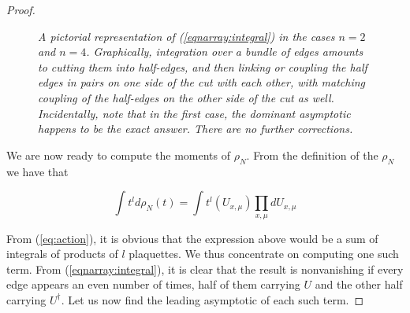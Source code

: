 \documentclass[twoside, a4paper,10pt]{article}
\newcommand{\be}{\begin{equation}}
\newcommand{\ee}{\end{equation}}
\begin{document}
\begin{proof}
\begin{figure}[h]


\caption{\textit{A pictorial representation of (\ref{eqnarray:integral}) in the cases $n=2$ and $n=4$. Graphically, integration over a bundle of edges amounts to cutting them into half-edges, and then linking or coupling the half edges in pairs on one side of the cut with each other, with matching coupling of the half-edges on the other side of the cut as well. Incidentally, note that in the first case, the dominant asymptotic happens to be the exact answer. There are no further corrections.}}
\label{fig2}
\end{figure}


We are now ready to compute the moments of $\rho_N$. From the definition of the $\rho_N$ we have that

\be
\label{eq:moment}
\int t^l d\rho_N(t) = \int t^l(U_{x, \mu} ) \prod_{x, \mu} dU_{x, \mu}
\ee

From (\ref{eq:action}), it is obvious that the expression above would be a sum of integrals of products of $l$ plaquettes. We thus concentrate on computing one such term. From (\ref{eqnarray:integral}), it is clear that the result is nonvanishing if every edge appears an even number of times, half of them carrying $U$ and the other half carrying $U^\dagger$. Let us now find the leading asymptotic of each such term. \newline


\end{proof}
\end{document}
